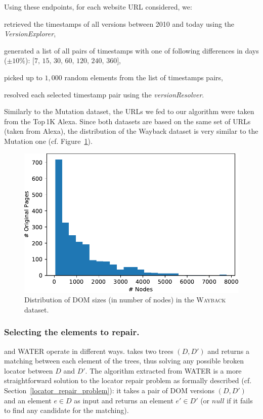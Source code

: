 \documentclass[preprint, 12pt]{elsarticle}
\begin{document}
Using these endpoints, for each website URL considered, we:
\begin{compactenum}
\item retrieved the timestamps of all versions between 2010 and today using the \textit{VersionExplorer},
\item generated a list of all pairs of timestamps with one of following differences in days ($\pm 10\%$): $\text{[7, 15, 30, 60, 120, 240, 360]}$,
\item picked up to $1,000$ random elements from the list of timestamps pairs,
\item resolved each selected timestamp pair using the \textit{versionResolver}.
\end{compactenum}

Similarly to the {\sc Mutation} dataset, the URLs we fed to our algorithm were taken from the Top\,1K Alexa.
Since both datasets are based on the same set of URLs (taken from Alexa), the distribution of the {\sc Wayback} dataset is very similar to the {\sc Mutation} one (cf. Figure~\ref{fig:distribution_wayback}).

\begin{figure}[h]
  \centering
  \includegraphics[width=.8\linewidth]{distribution_wayback}
  \caption{Distribution of DOM sizes (in number of nodes) in the \textsc{Wayback} dataset.}
  \label{fig:distribution_wayback}
\end{figure}

\subsubsection{Selecting the elements to repair.}
\erratum{} and WATER operate in different ways.
\erratum{} takes two trees $(D, D')$ and returns a matching between each element of the trees, thus solving any possible broken locator between $D$ and $D'$.
The algorithm extracted from WATER is a more straightforward solution to the locator repair problem as formally described (cf. Section~\ref{locator_repair_problem}): it takes a pair of DOM versions $(D,D')$ and an element $e \in D$ as input and returns an element $e' \in D'$ (or $null$ if it fails to find any candidate for the matching).
\end{document}
